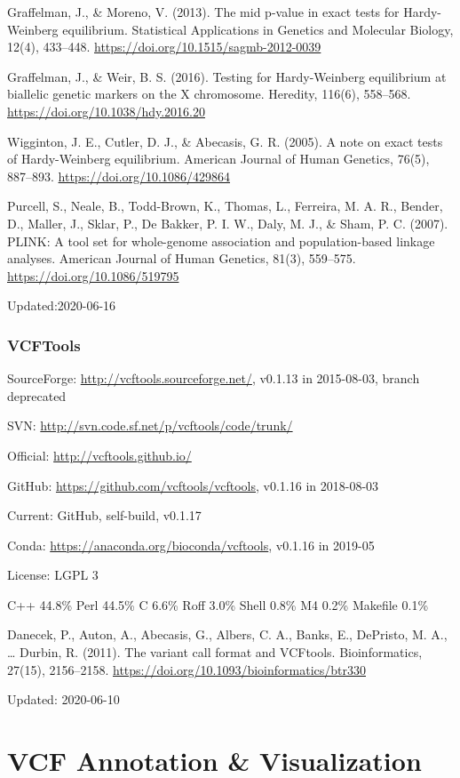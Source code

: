 \documentclass[]{article}
\begin{document}
Graffelman, J., \& Moreno, V. (2013). The mid p-value in exact tests for Hardy-Weinberg equilibrium. Statistical Applications in Genetics and Molecular Biology, 12(4), 433–448. \url{https://doi.org/10.1515/sagmb-2012-0039}

Graffelman, J., \& Weir, B. S. (2016). Testing for Hardy-Weinberg equilibrium at biallelic genetic markers on the X chromosome. Heredity, 116(6), 558–568. \url{https://doi.org/10.1038/hdy.2016.20}

Wigginton, J. E., Cutler, D. J., \& Abecasis, G. R. (2005). A note on exact tests of Hardy-Weinberg equilibrium. American Journal of Human Genetics, 76(5), 887–893. \url{https://doi.org/10.1086/429864}

Purcell, S., Neale, B., Todd-Brown, K., Thomas, L., Ferreira, M. A. R., Bender, D., Maller, J., Sklar, P., De Bakker, P. I. W., Daly, M. J., \& Sham, P. C. (2007). PLINK: A tool set for whole-genome association and population-based linkage analyses. American Journal of Human Genetics, 81(3), 559–575. \url{https://doi.org/10.1086/519795}

Updated:2020-06-16

\section{VCFTools}

SourceForge: \url{http://vcftools.sourceforge.net/}, v0.1.13 in 2015-08-03, branch deprecated

SVN: \url{http://svn.code.sf.net/p/vcftools/code/trunk/}

Official: \url{http://vcftools.github.io/}

GitHub: \url{https://github.com/vcftools/vcftools}, v0.1.16 in 2018-08-03

Current: GitHub, self-build, v0.1.17

Conda: \url{https://anaconda.org/bioconda/vcftools}, v0.1.16 in 2019-05

License: LGPL 3

C++ 44.8\% Perl 44.5\% C 6.6\% Roff 3.0\% Shell 0.8\% M4 0.2\% Makefile 0.1\%

Danecek, P., Auton, A., Abecasis, G., Albers, C. A., Banks, E., DePristo, M. A., … Durbin, R. (2011). The variant call format and VCFtools. Bioinformatics, 27(15), 2156–2158. \url{https://doi.org/10.1093/bioinformatics/btr330}

Updated: 2020-06-10

\part{VCF Annotation \& Visualization}
\end{document}
